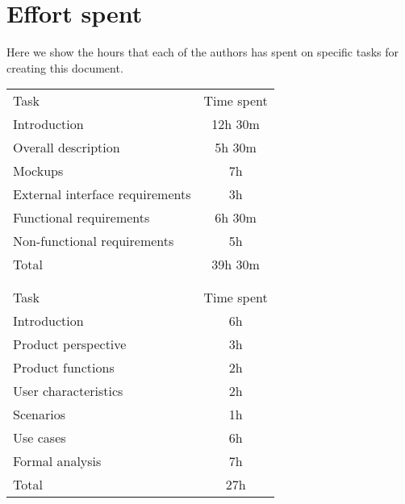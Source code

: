 \chapter{Effort spent}
Here we show the hours that each of the authors has spent on specific tasks
for creating this document.

\vspace{\baselineskip}\noindent
{
    \sffamily
    \begin{tabu} to \linewidth {l c}
        \rowfont{\bfseries}
         \\
        \toprule
        \rowfont{\bfseries}
        Task & Time spent \\
        \midrule
        Introduction & 12h 30m \\
        Overall description & 5h 30m \\
        Mockups & 7h \\
        External interface requirements & 3h \\
        Functional requirements & 6h 30m \\
        Non-functional requirements & 5h \\
        \bottomrule
        \rowfont{\bfseries}
        Total & 39h 30m \\
        \\
        \rowfont{\bfseries}
         \\
        \toprule
        \rowfont{\bfseries}
        Task & Time spent \\
        \midrule
        Introduction & 6h \\
        Product perspective & 3h \\
        Product functions & 2h \\
        User characteristics & 2h \\
        Scenarios & 1h \\
        Use cases & 6h \\
        Formal analysis & 7h \\
        \bottomrule
        \rowfont{\bfseries}
        Total & 27h
    \end{tabu}
}